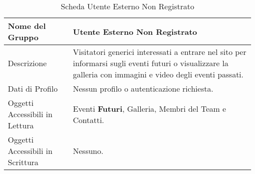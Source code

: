 \begin{table}[H]
    \begin{center}  
        \begin{tabular}{ | l | p{10cm} |} %
        \hline
        \textbf{Nome del Gruppo} & \textbf{Utente Esterno Non Registrato}\\ \hline  
           
        Descrizione & Visitatori generici interessati a entrare nel sito per informarsi sugli eventi futuri o visualizzare la galleria con immagini e video degli eventi passati.\\ \hline  
           
        Dati di Profilo & Nessun profilo o autenticazione richiesta.\\ \hline  
           
        Oggetti Accessibili in Lettura & Eventi \textbf{Futuri}, Galleria, Membri del Team e Contatti.\\ \hline  
           
        Oggetti Accessibili in Scrittura & Nessuno.\\ \hline  
           
        \end{tabular}  
        \caption{Scheda Utente Esterno Non Registrato}
    \end{center}  
\end{table}